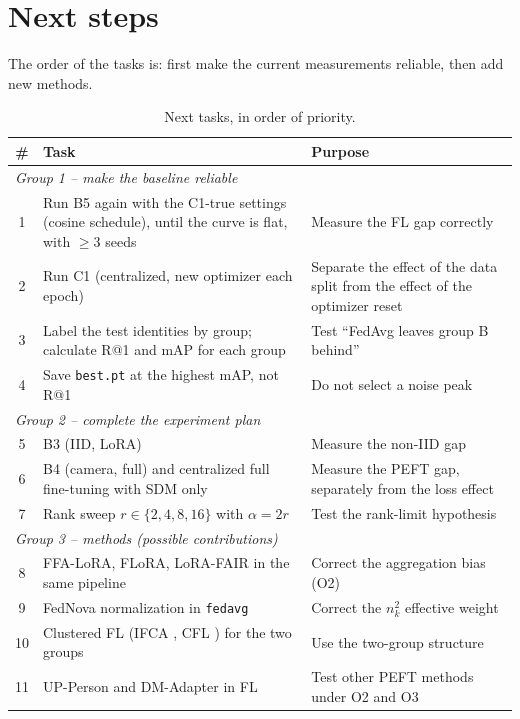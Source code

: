 \section{Next steps}\label{sec:next}

The order of the tasks is: first make the current measurements reliable, then add new methods.

\begin{table}[t]
\centering\small
\caption{Next tasks, in order of priority.}\label{tab:next}
\begin{tabularx}{\textwidth}{c >{\raggedright\arraybackslash}p{6.4cm} X}
\toprule
\# & Task & Purpose\\
\midrule
\multicolumn{3}{l}{\textit{Group 1 -- make the baseline reliable}}\\
1 & Run B5 again with the C1-true settings (cosine schedule), until the curve is flat, with $\ge3$ seeds & Measure the FL gap correctly\\
2 & Run C1 (centralized, new optimizer each epoch) & Separate the effect of the data split from the effect of the optimizer reset\\
3 & Label the test identities by group; calculate R@1 and mAP for each group & Test ``FedAvg leaves group B behind''\\
4 & Save \texttt{best.pt} at the highest mAP, not R@1 & Do not select a noise peak\\
\multicolumn{3}{l}{\textit{Group 2 -- complete the experiment plan}}\\
5 & B3 (IID, LoRA) & Measure the non-IID gap\\
6 & B4 (camera, full) and centralized full fine-tuning with SDM only & Measure the PEFT gap, separately from the loss effect\\
7 & Rank sweep $r\in\{2,4,8,16\}$ with $\alpha=2r$ & Test the rank-limit hypothesis\\
\multicolumn{3}{l}{\textit{Group 3 -- methods (possible contributions)}}\\
8 & FFA-LoRA, FLoRA, LoRA-FAIR in the same pipeline & Correct the aggregation bias (O2)\\
9 & FedNova normalization in \texttt{fedavg} & Correct the $n_k^2$ effective weight\\
10 & Clustered FL (IFCA \citep{ghosh2021efficientframeworkclusteredfederated}, CFL \citep{sattler2019clusteredfederatedlearningmodelagnostic}) for the two groups & Use the two-group structure\\
11 & UP-Person and DM-Adapter in FL & Test other PEFT methods under O2 and O3\\
\bottomrule
\end{tabularx}
\end{table}

